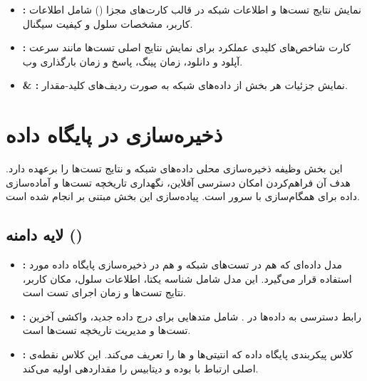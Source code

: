 \begin{itemize}
    \item \textbf{:}  
    نمایش نتایج تست‌ها و اطلاعات شبکه در قالب کارت‌های مجزا () شامل اطلاعات کاربر، مشخصات سلول و کیفیت سیگنال.
    
    \item \textbf{:}  
    کارت شاخص‌های کلیدی عملکرد برای نمایش نتایج اصلی تست‌ها مانند سرعت آپلود و دانلود، زمان پینگ، پاسخ  و زمان بارگذاری وب.
    
    \item \textbf{ \& :}  
    نمایش جزئیات هر بخش از داده‌های شبکه به صورت ردیف‌های کلید-مقدار.
\end{itemize}




\section{ذخیره‌سازی در پایگاه داده}
این بخش وظیفه ذخیره‌سازی محلی داده‌های شبکه و نتایج تست‌ها را برعهده دارد. هدف آن فراهم‌کردن امکان دسترسی آفلاین، نگهداری تاریخچه تست‌ها و آماده‌سازی داده برای همگام‌سازی با سرور است. پیاده‌سازی این بخش مبتنی بر  انجام شده است.

\subsection{لایه دامنه ()}
\begin{itemize}
    \item \textbf{:}  
    مدل داده‌ای که هم در تست‌های شبکه و هم در ذخیره‌سازی پایگاه داده مورد استفاده قرار می‌گیرد. این مدل شامل شناسه یکتا، اطلاعات سلول، مکان کاربر، نتایج تست‌ها و زمان اجرای تست است.


    \item \textbf{:}  
    رابط دسترسی به داده‌ها در . شامل متدهایی برای درج داده جدید، واکشی آخرین تست‌ها و مدیریت تاریخچه تست‌ها است.
    
    \item \textbf{:}  
    کلاس پیکربندی پایگاه داده  که انتیتی‌ها و ‌ها را تعریف می‌کند. این کلاس نقطه‌ی اصلی ارتباط با  بوده و دیتابیس را مقداردهی اولیه می‌کند.

\end{itemize}


